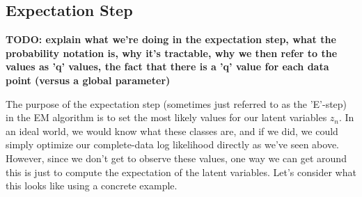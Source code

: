 \subsection{Expectation Step}
\textbf{TODO: explain what we're doing in the expectation step, what the probability notation is, why it's tractable, why we then refer to the values as 'q' values, the fact that there is a 'q' value for each data point (versus a global parameter)}

The purpose of the expectation step (sometimes just referred to as the 'E'-step) in the EM algorithm is to set the most likely values for our latent variables $z_n$. In an ideal world, we would know what these classes are, and if we did, we could simply optimize our complete-data log likelihood directly as we've seen above. However, since we don't get to observe these values, one way we can get around this is just to compute the expectation of the latent variables. Let's consider what this looks like using a concrete example.

